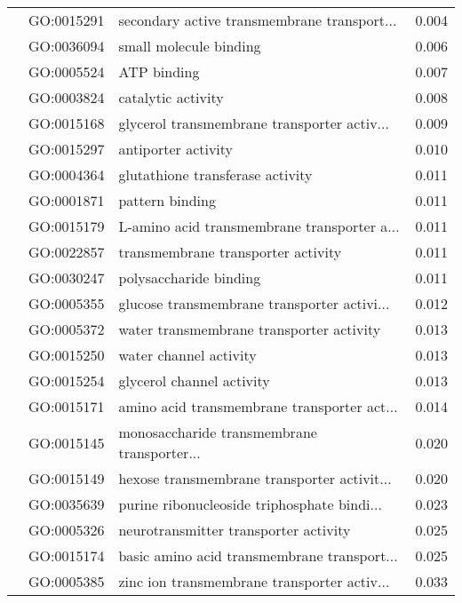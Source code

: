 \begin{longtable}{lllr}
   & GO:0015291 &  secondary active transmembrane transport... &         0.004 \\
   & GO:0036094 &                       small molecule binding &         0.006 \\
   & GO:0005524 &                                  ATP binding &         0.007 \\
   & GO:0003824 &                           catalytic activity &         0.008 \\
   & GO:0015168 &  glycerol transmembrane transporter activ... &         0.009 \\
   & GO:0015297 &                          antiporter activity &         0.010 \\
   & GO:0004364 &             glutathione transferase activity &         0.011 \\
   & GO:0001871 &                              pattern binding &         0.011 \\
   & GO:0015179 &  L-amino acid transmembrane transporter a... &         0.011 \\
   & GO:0022857 &           transmembrane transporter activity &         0.011 \\
   & GO:0030247 &                       polysaccharide binding &         0.011 \\
   & GO:0005355 &  glucose transmembrane transporter activi... &         0.012 \\
   & GO:0005372 &     water transmembrane transporter activity &         0.013 \\
   & GO:0015250 &                       water channel activity &         0.013 \\
   & GO:0015254 &                    glycerol channel activity &         0.013 \\
   & GO:0015171 &  amino acid transmembrane transporter act... &         0.014 \\
   & GO:0015145 &  monosaccharide transmembrane transporter... &         0.020 \\
   & GO:0015149 &  hexose transmembrane transporter activit... &         0.020 \\
   & GO:0035639 &  purine ribonucleoside triphosphate bindi... &         0.023 \\
   & GO:0005326 &        neurotransmitter transporter activity &         0.025 \\
   & GO:0015174 &  basic amino acid transmembrane transport... &         0.025 \\
   & GO:0005385 &  zinc ion transmembrane transporter activ... &         0.033 \\

\end{longtable}

